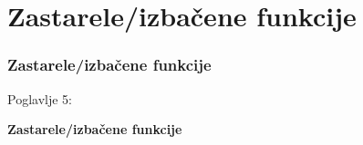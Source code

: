 %

\section{Zastarele/izbačene funkcije}
\begin{frame}[fragile]
	\frametitle{Zastarele/izbačene funkcije}

	\begin{center}\huge{Poglavlje 5:}\end{center}
	\begin{center}\huge{\color{typo3darkgrey}\textbf{Zastarele/izbačene funkcije}}\end{center}

\end{frame}


